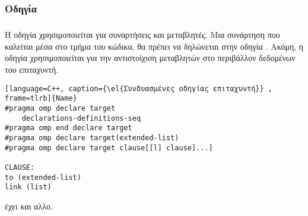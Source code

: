 \subsubsection{Οδηγία \emph{}}
\subparagraph{}
Η οδηγία \emph{} χρησιμοποιείται για συναρτήσεις και μεταβλητές. Μια συνάρτηση που καλείται μέσα στο τμήμα του \emph{} κώδικα, θα πρέπει να δηλώνεται στην οδηγία \emph{}. Ακόμη, η οδηγία χρησιμοποιείται για την αντιστοίχιση \emph{} μεταβλητών στο περιβάλλον δεδομένων του επιταχυντή.



\begin{lstlisting}[language=C++, caption={\el{Συνδυασμένες οδηγίας επιταχυντή}} , frame=tlrb]{Name}
#pragma omp declare target
	declarations-definitions-seq
#pragma omp end declare target
#pragma omp declare target(extended-list)
#pragma omp declare target clause[[l] clause]...]

CLAUSE:
to (extended-list)
link (list)
\end{lstlisting}

\textbf{} έχει και αλλο.
